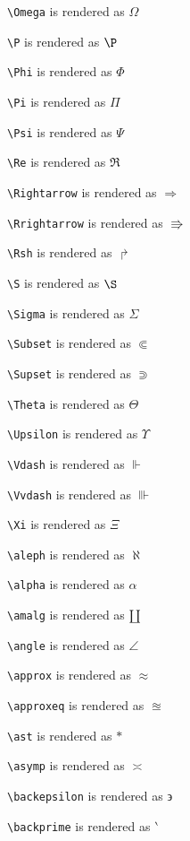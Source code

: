 \texttt{\textbackslash Omega} is rendered as $\Omega$

\texttt{\textbackslash P} is rendered as $\P$

\texttt{\textbackslash Phi} is rendered as $\Phi$

\texttt{\textbackslash Pi} is rendered as $\Pi$

\texttt{\textbackslash Psi} is rendered as $\Psi$

\texttt{\textbackslash Re} is rendered as $\Re$

\texttt{\textbackslash Rightarrow} is rendered as $\Rightarrow$

\texttt{\textbackslash Rrightarrow} is rendered as $\Rrightarrow$

\texttt{\textbackslash Rsh} is rendered as $\Rsh$

\texttt{\textbackslash S} is rendered as $\S$

\texttt{\textbackslash Sigma} is rendered as $\Sigma$

\texttt{\textbackslash Subset} is rendered as $\Subset$

\texttt{\textbackslash Supset} is rendered as $\Supset$

\texttt{\textbackslash Theta} is rendered as $\Theta$

\texttt{\textbackslash Upsilon} is rendered as $\Upsilon$

\texttt{\textbackslash Vdash} is rendered as $\Vdash$

\texttt{\textbackslash Vvdash} is rendered as $\Vvdash$

\texttt{\textbackslash Xi} is rendered as $\Xi$

\texttt{\textbackslash aleph} is rendered as $\aleph$

\texttt{\textbackslash alpha} is rendered as $\alpha$

\texttt{\textbackslash amalg} is rendered as $\amalg$

\texttt{\textbackslash angle} is rendered as $\angle$

\texttt{\textbackslash approx} is rendered as $\approx$

\texttt{\textbackslash approxeq} is rendered as $\approxeq$

\texttt{\textbackslash ast} is rendered as $\ast$

\texttt{\textbackslash asymp} is rendered as $\asymp$

\texttt{\textbackslash backepsilon} is rendered as $\backepsilon$

\texttt{\textbackslash backprime} is rendered as $\backprime$


